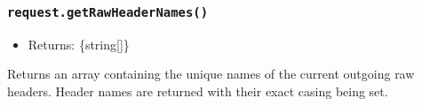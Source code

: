 \begin{Shaded}
\begin{Highlighting}[]
\NormalTok{(}\OperatorTok{,} \NormalTok{)}\OperatorTok{;}
\NormalTok{(}\OperatorTok{,}\NormalTok{ [}\OperatorTok{,} \NormalTok{])}\OperatorTok{;}

\OperatorTok{=}\NormalTok{()}\OperatorTok{;}
\end{Highlighting}
\end{Shaded}

\subsubsection{\texorpdfstring{\texttt{request.getRawHeaderNames()}}{request.getRawHeaderNames()}}\label{request.getrawheadernames}

\begin{itemize}
\tightlist
\item
  Returns: \{string{[}{]}\}
\end{itemize}

Returns an array containing the unique names of the current outgoing raw
headers. Header names are returned with their exact casing being set.

\begin{Shaded}
\begin{Highlighting}[]
\NormalTok{(}\OperatorTok{,} \NormalTok{)}\OperatorTok{;}
\NormalTok{(}\OperatorTok{,}\NormalTok{ [}\OperatorTok{,} \NormalTok{])}\OperatorTok{;}

\OperatorTok{=}\NormalTok{()}\OperatorTok{;}
\end{Highlighting}
\end{Shaded}

